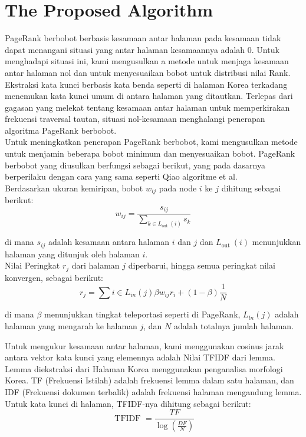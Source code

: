 \documentclass[conference]{IEEEtran}
\begin{document}
\section{The Proposed Algorithm}
PageRank berbobot berbasis kesamaan antar halaman
pada kesamaan tidak dapat menangani situasi yang antar halaman
kesamaannya adalah 0. Untuk menghadapi situasi ini, kami mengusulkan a
metode untuk menjaga kesamaan antar halaman nol dan untuk menyesuaikan
bobot untuk distribusi nilai Rank.\\

Ekstraksi kata kunci berbasis kata benda seperti di halaman Korea
terkadang menemukan kata kunci umum di antara halaman yang ditautkan.
Terlepas dari gagasan yang melekat tentang kesamaan antar halaman untuk memperkirakan
frekuensi traversal tautan, situasi nol-kesamaan menghalangi
penerapan algoritma PageRank berbobot.\\

Untuk meningkatkan penerapan PageRank berbobot, kami
mengusulkan metode untuk menjamin beberapa bobot minimum dan
menyesuaikan bobot. PageRank berbobot yang diusulkan berfungsi sebagai
berikut, yang pada dasarnya berperilaku dengan cara yang sama seperti Qiao
algoritme et al.\cite{qiao2010simrank}\\

Berdasarkan ukuran kemiripan, bobot ${w_{ij}}$ pada node $i$ ke $j$ dihitung sebagai berikut:
\begin{equation}
    w_{i j}=\frac{s_{i j}}{\sum_{k \in L_{\text {out }}(i)} s_{k}}
    \end{equation}

    di mana ${s_{ij}}$ adalah kesamaan antara halaman $i$ dan $j$ dan ${L_{\text {out }}(i)}$ menunjukkan halaman yang ditunjuk oleh halaman $i$.\\

    Nilai Peringkat $r_j$ dari halaman $j$ diperbarui, hingga semua peringkat
nilai konvergen, sebagai berikut:
\begin{equation}
    r_{j}=\sum{i \in L_{i n}(j)} \beta w_{i j} r_{i}+(1-\beta) \frac{1}{N}
    \end{equation}

    di mana $\beta$ menunjukkan tingkat teleportasi seperti di PageRank,
    ${L_{ln}(j)}$ adalah halaman yang mengarah ke halaman $j$, dan $N$ adalah totalnya jumlah halaman.

    Untuk mengukur kesamaan antar halaman, kami menggunakan cosinus
    jarak antara vektor kata kunci yang elemennya adalah
    Nilai TFIDF dari lemma. Lemma diekstraksi dari
    Halaman Korea menggunakan penganalisa morfologi Korea. TF
    (Frekuensi Istilah) adalah frekuensi lemma dalam satu halaman, dan
    IDF (Frekuensi dokumen terbalik) adalah frekuensi halaman
    mengandung lemma.\cite{schutze2008introduction} Untuk kata kunci di halaman, TFIDF-nya
    dihitung sebagai berikut:
    \begin{equation}
        \text { TFIDF }=\frac{T F}{\log \left(\frac{D F}{N}\right)}
        \end{equation}
\end{document}
